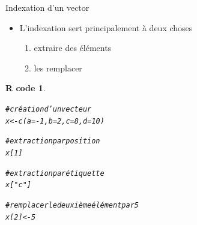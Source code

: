 \documentclass[11pt]{beamer}\usepackage[]{graphicx}\usepackage[]{color}
\makeatletter
\newcommand{\hlnum}[1]{\textcolor[rgb]{0.063,0.58,0.627}{#1}}%
\newcommand{\hlstr}[1]{\textcolor[rgb]{0.063,0.58,0.627}{#1}}%
\newcommand{\hlcom}[1]{\textcolor[rgb]{0.588,0.588,0.588}{#1}}%
\newcommand{\hlopt}[1]{\textcolor[rgb]{0.196,0.196,0.196}{#1}}%
\newcommand{\hlstd}[1]{\textcolor[rgb]{0.196,0.196,0.196}{#1}}%
\newcommand{\hlkwb}[1]{\textcolor[rgb]{0.627,0,0.314}{#1}}%
\newcommand{\hlkwc}[1]{\textcolor[rgb]{0,0.631,0.314}{#1}}%
\newcommand{\hlkwd}[1]{\textcolor[rgb]{0.78,0.227,0.412}{#1}}%
\newenvironment{kframe}{%
 \def\at@end@of@kframe{}%
 \ifinner\ifhmode%
  \def\at@end@of@kframe{\end{minipage}}%
  \begin{minipage}{\columnwidth}%
 \fi\fi%
 \def\FrameCommand##1{\hskip\@totalleftmargin \hskip-\fboxsep
 \colorbox{shadecolor}{##1}\hskip-\fboxsep
     \hskip-\linewidth \hskip-\@totalleftmargin \hskip\columnwidth}%
 \MakeFramed {\advance\hsize-\width
   \@totalleftmargin\z@ \linewidth\hsize
   \@setminipage}}%
 {\par\unskip\endMakeFramed%
 \at@end@of@kframe}
\newenvironment{knitrout}{}{} %
\newtheorem{rcode}{R code}[section]
\makeatother
\begin{document}
\begin{frame}[fragile]{Indexation d'un vector}
\begin{itemize}
  \setlength\itemsep{2em}
\item L'indexation sert principalement à deux choses
\pause \begin{enumerate}
\normalsize
\item extraire des éléments 
\item les remplacer
\end{enumerate}
\end{itemize}
\pause 
\begin{knitrout}
\color{fgcolor}\begin{kframe}
\begin{rcode}\label{unnamed-chunk-25}\begin{alltt}
\hlcom{# création d'un vecteur}
\hlstd{x} \hlkwb{<-} \hlkwd{c}\hlstd{(}\hlkwc{a} \hlstd{=} \hlopt{-}\hlnum{1}\hlstd{,} \hlkwc{b} \hlstd{=} \hlnum{2}\hlstd{,} \hlkwc{c} \hlstd{=} \hlnum{8}\hlstd{,} \hlkwc{d} \hlstd{=} \hlnum{10}\hlstd{)}

\hlcom{# extraction par position}
\hlstd{x[}\hlnum{1}\hlstd{]}

\hlcom{# extraction par étiquette}
\hlstd{x[}\hlstr{"c"}\hlstd{]}

\hlcom{# remplacer le deuxième élément par 5}
\hlstd{x[}\hlnum{2}\hlstd{]} \hlkwb{<-} \hlnum{5}
\end{alltt}
\end{rcode}\end{kframe}
\end{knitrout}
\end{frame}
\end{document}
